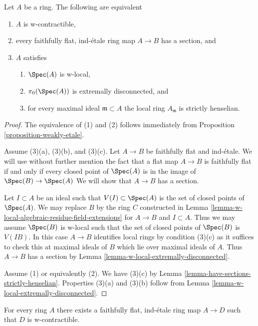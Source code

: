 \begin{lemma}
\label{lemma-w-local-strictly-henselian-extremally-disconnected}
Let $A$ be a ring. The following are equivalent
\begin{enumerate}
\item $A$ is w-contractible,
\item every faithfully flat, ind-\'etale ring map $A \to B$ has
a section, and
\item $A$ satisfies
\begin{enumerate}
\item $\Spec(A)$ is w-local,
\item $\pi_0(\Spec(A))$ is extremally disconnected, and
\item for every maximal ideal $\mathfrak m \subset A$ the
local ring $A_\mathfrak m$ is strictly henselian.
\end{enumerate}
\end{enumerate}
\end{lemma}

\begin{proof}
The equivalence of (1) and (2) follows immediately from
Proposition \ref{proposition-weakly-etale}.

\medskip\noindent
Assume (3)(a), (3)(b), and (3)(c). Let $A \to B$ be faithfully flat
and ind-\'etale. We will use without further mention the fact that a flat map
$A \to B$ is faithfully flat if and only if every closed point
of $\Spec(A)$ is in the image of $\Spec(B) \to \Spec(A)$
We will show that $A \to B$ has a section.

\medskip\noindent
Let $I \subset A$ be an ideal such that $V(I) \subset \Spec(A)$ is
the set of closed points of $\Spec(A)$. 
We may replace $B$ by the ring $C$ constructed in
Lemma \ref{lemma-w-local-algebraic-residue-field-extensions}
for $A \to B$ and $I \subset A$.
Thus we may assume $\Spec(B)$ is w-local such that the set of
closed points of $\Spec(B)$ is $V(IB)$. In this case $A \to B$
identifies local rings by condition (3)(c) as it suffices to check
this at maximal ideals of $B$ which lie over maximal ideals of $A$.
Thus $A \to B$ has a section by
Lemma \ref{lemma-w-local-extremally-disconnected}.

\medskip\noindent
Assume (1) or equivalently (2). We have (3)(c) by
Lemma \ref{lemma-have-sections-strictly-henselian}.
Properties (3)(a) and (3)(b) follow from
Lemma \ref{lemma-w-local-extremally-disconnected}.
\end{proof}

\begin{proposition}
\label{proposition-find-w-contractible}
For every ring $A$ there exists a faithfully flat, ind-\'etale ring
map $A \to D$ such that $D$ is w-contractible.
\end{proposition}

